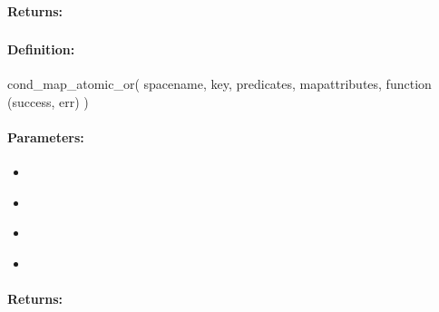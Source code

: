 \paragraph{Returns:}


\pagebreak
\subsubsection{}
\label{api:nodejs:cond_map_atomic_or}


\paragraph{Definition:}
\begin{javascriptcode}
cond_map_atomic_or(
        spacename, key, predicates, mapattributes, function (success, err) {})
\end{javascriptcode}
\paragraph{Parameters:}
\begin{itemize}[noitemsep]
\item {}\\

\item {}\\

\item {}\\

\item {}\\

\end{itemize}

\paragraph{Returns:}


\pagebreak
\subsubsection{}
\label{api:nodejs:group_map_atomic_or}


